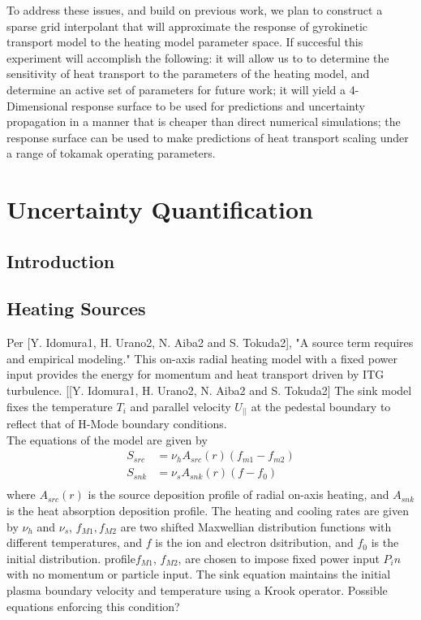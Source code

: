 \documentclass{article}
\begin{document}
\vspace{0.01cm}


\vspace{0.01cm}

To address these issues, and build on previous work, we plan to construct a sparse grid interpolant that will approximate the response of gyrokinetic transport model to the heating model parameter space. If succesful this experiment will accomplish the following: it will allow us to to determine the sensitivity of heat transport  to the parameters of the heating model, and determine an active set of parameters for future work; it will yield a 4-Dimensional response surface to be used for predictions and uncertainty propagation in a manner that is cheaper than direct numerical simulations; the response surface can be used to make predictions of heat transport scaling under a range of tokamak operating parameters.\\

\section{Uncertainty Quantification}

\subsection{Introduction}

\subsection{Heating Sources}
Per [Y. Idomura1, H. Urano2, N. Aiba2 and S. Tokuda2], "A source term requires and empirical modeling." This on-axis radial heating model with a fixed power input provides the energy for momentum and heat transport driven by ITG turbulence. [[Y. Idomura1, H. Urano2, N. Aiba2 and S. Tokuda2] The sink model fixes the temperature $T_i$ and parallel velocity $U_{||}$  at the pedestal boundary to reflect that of H-Mode boundary conditions.\\
The equations of the model are given by
\begin{align*}
S_{src} &= \nu_h A_{src}(r)(f_{m1} - f_{m2})\\
S_{snk} &= \nu_s A_{snk}(r)(f-f_0)\\	
\end{align*}
where $A_{src}(r)$ is the source deposition profile of radial on-axis heating, and $A_{snk}$ is the heat absorption deposition profile. The heating and cooling rates are given by $\nu_h$ and $\nu_s$, $f_{M1}, f_{M2}$ are two shifted Maxwellian distribution functions with different temperatures, and $f$ is the ion and electron dsitribution, and $f_0$ is the initial distribution. profile$f_{M1}$, $f_{M2}$, are chosen to impose fixed power input $P_in$ with no momentum or particle input.  The sink equation maintains the initial plasma boundary velocity and temperature using a Krook operator. Possible equations enforcing this condition?\\
\end{document}
